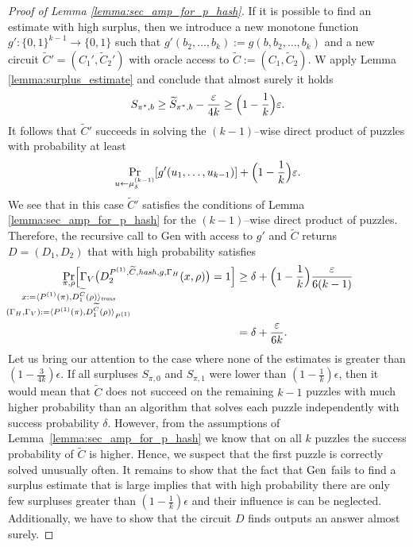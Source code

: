 \begin{proof}[Proof of Lemma \ref{lemma:sec_amp_for_p_hash}]
If it is possible to find an estimate with high surplus, then we introduce a new monotone function $g': \{0,1\}^{k-1} \rightarrow \{0,1\}$
such that $g'(b_2, \dots, b_k) := g(b, b_2, \dots, b_k)$ and a new circuit $\widetilde{C}' = (C_1', \widetilde{C}_2')$
with oracle access to $\widetilde{C} := (C_1, \widetilde{C}_2)$.
W apply Lemma \ref{lemma:surplus_estimate} and conclude that almost surely it holds
\begin{align*}
S_{\pi^*,b} \geq \widetilde{S}_{\pi^*, b} - \frac{\epsilon}{4k} \geq \Bigl(1 - \frac{1}{k}\Bigr)\epsilon.
\end{align*}
It follows that $\widetilde{C}'$ succeeds in solving the $(k\!-\!1)$--wise direct product of puzzles with probability at least
\begin{align*}
\Pr_{u \leftarrow \mu^{(k-1)}_{\delta}}[g'(u_1,\dots, u_{k-1} )] + \Bigl(1 - \frac{1}{k}\Bigr)\epsilon.
\end{align*}
We see that in this case $\widetilde{C}'$ satisfies the conditions of Lemma \ref{lemma:sec_amp_for_p_hash} for the $(k\!-\!1)$--wise direct product of puzzles.
Therefore, the recursive call to Gen with access to $g'$ and $\widetilde{C}$ returns $D = (D_1, D_2)$ that with high probability satisfies
\begin{align}
  \underset{
    \mathclap{
      \substack{
        \pi, \rho \\
        x := \langle P^{(1)}(\pi), D_1^{\widetilde{C}}(\rho) \rangle_{\mathit{trans}} \\
        (\Gamma_H, \Gamma_V) := \langle P^{(1)}(\pi), D_1^{\widetilde{C}}(\rho) \rangle_{P^{(1)}}}}}
  {\Pr}\Big[\Gamma_V\big(D_2^{P^{(1)}, \widetilde{C}, \hash, g, \Gamma_H}(x, \rho)\big) = 1\Big]
  &\geq \delta + \Bigl(1 - \frac{1}{k}\Bigr)\frac{\epsilon}{6(k-1)} \notag\\
  &= \delta + \frac{\epsilon}{6k}.
\end{align}
%
Let us bring our attention to the case where none of the estimates is greater than $(1-\frac{3}{4k})\epsilon$.
If all surpluses $S_{\pi,0}$ and $S_{\pi,1}$ were lower than $(1-\frac{1}{k})\epsilon$, then it would mean that $\widetilde{C}$
does not succeed on the remaining $k-1$ puzzles with much higher probability than an algorithm that solves each puzzle
independently with success probability $\delta$. However, from the assumptions of Lemma~\ref{lemma:sec_amp_for_p_hash}
we know that on all $k$ puzzles the success probability of $\widetilde{C}$ is higher.
Hence, we suspect that the first puzzle is correctly solved unusually often.
It remains to show that the fact that $\Gen$ fails to find a surplus estimate that is large implies that
with high probability there are only few surpluses greater than $(1-\frac{1}{k})\epsilon$ and their influence
is can be neglected. Additionally, we have to show that the circuit $D$ finds outputs an answer almost surely.


\end{proof}
